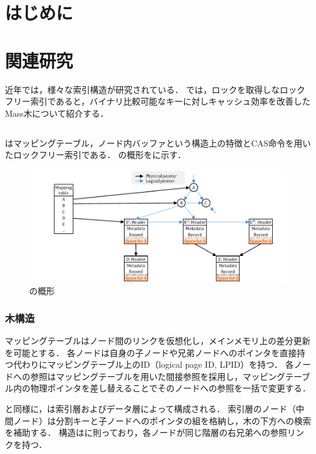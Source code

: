 
\section{はじめに}

\section{関連研究}
\label{sec:relatedwork}
近年では，様々な索引構造が研究されている．
\Sec{\ref{sec:relatedwork}}では，ロックを取得しなロックフリー索引である\Bctree{}と，バイナリ比較可能なキーに対しキャッシュ効率を改善したMass木について紹介する．

\subsection{\Bctree{}}
\Bctree{}はマッピングテーブル，ノード内バッファという構造上の特徴とCAS命令を用いたロックフリー索引である．
\Bctree{}の概形を\Fig{\ref{fig:bc_tree-structure}}に示す．

\begin{figure}[t]
    \centering
    \includegraphics{./figures/Bc-structure.pdf}
    \caption{\Bctree{}の概形}
    \label{fig:bc_tree-structure}
\end{figure}

\subsubsection{木構造}
マッピングテーブルはノード間のリンクを仮想化し，メインメモリ上の差分更新を可能とする．
各ノードは自身の子ノードや兄弟ノードへのポインタを直接持つ代わりにマッピングテーブル上のID（logical page ID, LPID）を持つ．
各ノードへの参照はマッピングテーブルを用いた間接参照を採用し，マッピングテーブル内の物理ポインタを差し替えることでそのノードへの参照を一括で変更する．

\Bptree{}と同様に，\Bctree{}は索引層およびデータ層によって構成される．
索引層のノード（中間ノード）は分割キーと子ノードへのポインタの組を格納し，木の下方への検索を補助する．
構造は\Blinktree{}に則っており，各ノードが同じ階層の右兄弟への参照リンクを持つ．

